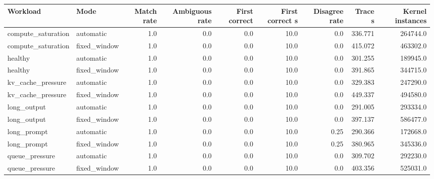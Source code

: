 \begin{tabular}{llrrrrrrr}
\hline
Workload & Mode & Match rate & Ambiguous rate & First correct & First correct s & Disagree rate & Trace s & Kernel instances \\
\hline
compute_saturation & automatic & 1.0 & 0.0 & 0.0 & 10.0 & 0.0 & 336.771 & 264744.0 \\
compute_saturation & fixed_window & 1.0 & 0.0 & 0.0 & 10.0 & 0.0 & 415.072 & 463302.0 \\
healthy & automatic & 1.0 & 0.0 & 0.0 & 10.0 & 0.0 & 301.255 & 189945.0 \\
healthy & fixed_window & 1.0 & 0.0 & 0.0 & 10.0 & 0.0 & 391.865 & 344715.0 \\
kv_cache_pressure & automatic & 1.0 & 0.0 & 0.0 & 10.0 & 0.0 & 329.383 & 247290.0 \\
kv_cache_pressure & fixed_window & 1.0 & 0.0 & 0.0 & 10.0 & 0.0 & 449.337 & 494580.0 \\
long_output & automatic & 1.0 & 0.0 & 0.0 & 10.0 & 0.0 & 291.005 & 293334.0 \\
long_output & fixed_window & 1.0 & 0.0 & 0.0 & 10.0 & 0.0 & 397.137 & 586477.0 \\
long_prompt & automatic & 1.0 & 0.0 & 0.0 & 10.0 & 0.25 & 290.366 & 172668.0 \\
long_prompt & fixed_window & 1.0 & 0.0 & 0.0 & 10.0 & 0.25 & 380.965 & 345336.0 \\
queue_pressure & automatic & 1.0 & 0.0 & 0.0 & 10.0 & 0.0 & 309.702 & 292230.0 \\
queue_pressure & fixed_window & 1.0 & 0.0 & 0.0 & 10.0 & 0.0 & 403.356 & 525031.0 \\
\hline
\end{tabular}
